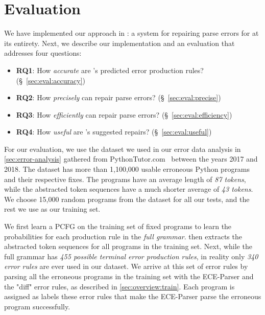\section{Evaluation}
\label{sec:eval}

We have implemented our approach in \toolname: a system for repairing parse
errors for \python at its entirety. Next, we describe our implementation and an
evaluation that addresses four questions:

\begin{itemize}
    \item \textbf{RQ1}: How \emph{accurate} are \toolname's predicted error production rules?
                        (\S~\ref{sec:eval:accuracy})
    \item \textbf{RQ2}: How \emph{precisely} can \toolname repair parse errors?
                        (\S~\ref{sec:eval:precise})
    \item \textbf{RQ3}: How \emph{efficiently} can \toolname repair parse errors?
                        (\S~\ref{sec:eval:efficiency})
    \item \textbf{RQ4}: How \emph{useful} are \toolname's suggested repairs?
                        (\S~\ref{sec:eval:useful})
\end{itemize}


For our evaluation, we use the \python dataset we used in our error data
analysis in \autoref{sec:error-analysis} gathered from
PythonTutor.com~\citep{Guo2013} between the years 2017 and 2018. The dataset has
more than 1,100,000 usable erroneous Python programs and their respective fixes.
The programs have an average length of \emph{87 tokens}, while the abstracted
token sequences have a much shorter average of \emph{43 tokens}. We choose
15,000 random programs from the dataset for all our tests, and the rest we use
as our training set.

We first learn a PCFG on the training set of fixed programs to learn
the probabilities for each production rule in the \emph{full \python
grammar}. \toolname then extracts the abstracted token sequences for all
programs in the training set. Next, while the full \python grammar has
\emph{455 possible terminal error production rules}, in reality only \emph{340 error rules} are ever used in our dataset.
We arrive at this set of error rules by parsing all the erroneous programs in
the training set with the ECE-Parser and the "diff" error rules, as described in
\autoref{sec:overview:train}. Each program is assigned as labels these
error rules that make the ECE-Parser parse the erroneous program successfully.

